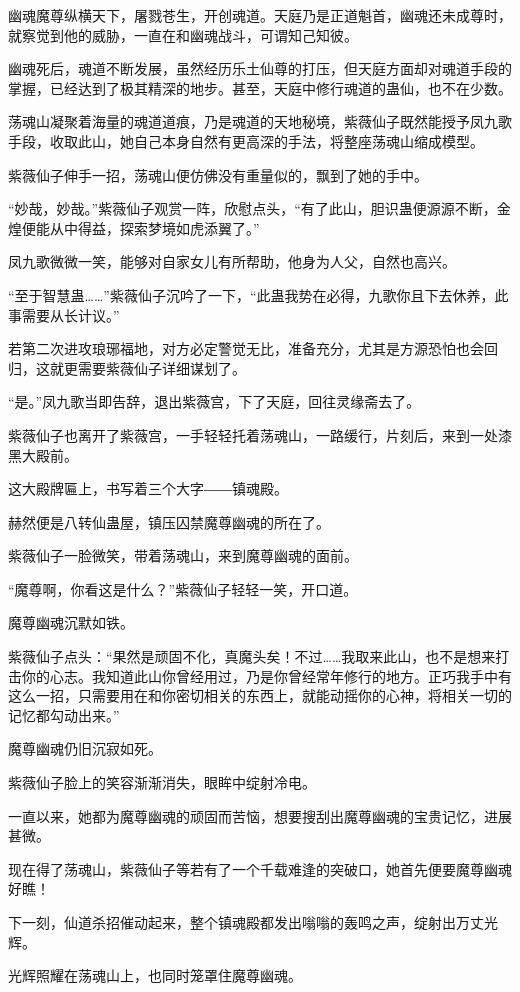 \begin{this_body}
幽魂魔尊纵横天下，屠戮苍生，开创魂道。天庭乃是正道魁首，幽魂还未成尊时，就察觉到他的威胁，一直在和幽魂战斗，可谓知己知彼。

幽魂死后，魂道不断发展，虽然经历乐土仙尊的打压，但天庭方面却对魂道手段的掌握，已经达到了极其精深的地步。甚至，天庭中修行魂道的蛊仙，也不在少数。

荡魂山凝聚着海量的魂道道痕，乃是魂道的天地秘境，紫薇仙子既然能授予凤九歌手段，收取此山，她自己本身自然有更高深的手法，将整座荡魂山缩成模型。

紫薇仙子伸手一招，荡魂山便仿佛没有重量似的，飘到了她的手中。

“妙哉，妙哉。”紫薇仙子观赏一阵，欣慰点头，“有了此山，胆识蛊便源源不断，金煌便能从中得益，探索梦境如虎添翼了。”

凤九歌微微一笑，能够对自家女儿有所帮助，他身为人父，自然也高兴。

“至于智慧蛊……”紫薇仙子沉吟了一下，“此蛊我势在必得，九歌你且下去休养，此事需要从长计议。”

若第二次进攻琅琊福地，对方必定警觉无比，准备充分，尤其是方源恐怕也会回归，这就更需要紫薇仙子详细谋划了。

“是。”凤九歌当即告辞，退出紫薇宫，下了天庭，回往灵缘斋去了。

紫薇仙子也离开了紫薇宫，一手轻轻托着荡魂山，一路缓行，片刻后，来到一处漆黑大殿前。

这大殿牌匾上，书写着三个大字――镇魂殿。

赫然便是八转仙蛊屋，镇压囚禁魔尊幽魂的所在了。

紫薇仙子一脸微笑，带着荡魂山，来到魔尊幽魂的面前。

“魔尊啊，你看这是什么？”紫薇仙子轻轻一笑，开口道。

魔尊幽魂沉默如铁。

紫薇仙子点头：“果然是顽固不化，真魔头矣！不过……我取来此山，也不是想来打击你的心志。我知道此山你曾经用过，乃是你曾经常年修行的地方。正巧我手中有这么一招，只需要用在和你密切相关的东西上，就能动摇你的心神，将相关一切的记忆都勾动出来。”

魔尊幽魂仍旧沉寂如死。

紫薇仙子脸上的笑容渐渐消失，眼眸中绽射冷电。

一直以来，她都为魔尊幽魂的顽固而苦恼，想要搜刮出魔尊幽魂的宝贵记忆，进展甚微。

现在得了荡魂山，紫薇仙子等若有了一个千载难逢的突破口，她首先便要魔尊幽魂好瞧！

下一刻，仙道杀招催动起来，整个镇魂殿都发出嗡嗡的轰鸣之声，绽射出万丈光辉。

光辉照耀在荡魂山上，也同时笼罩住魔尊幽魂。


\end{this_body}
